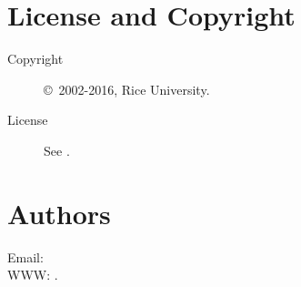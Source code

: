 \documentclass[english]{article}
\begin{document}
\section{License and Copyright}

\begin{description}
\item[Copyright] \copyright\ 2002-2016, Rice University.
\item[License] See .
\end{description}

\section{Authors}

Email:  \\
WWW: .

\LatexManEnd
\end{document}
